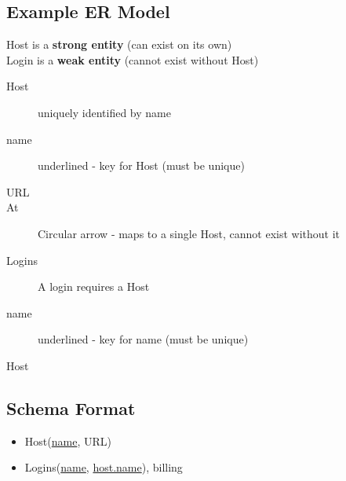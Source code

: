 \documentclass{article}
\begin{document}
\subsection{Example ER Model}

\begin{figure}[h!]
\end{figure}

Host is a \textbf{strong entity} (can exist on its own)\\
Login is a \textbf{weak entity} (cannot exist without Host)\\
\begin{description}
  \item[Host] uniquely identified by name
  \item[name] underlined - key for Host (must be unique)
  \item[URL]
  \item[At] Circular arrow - maps to a single Host, cannot exist without it
  \item[Logins] A login requires a Host
  \item[name] underlined - key for name (must be unique)
  \item[Host]
\end{description}

\subsection{Schema Format}
\begin{itemize}
  \item{Host(\underline{name}, URL)}
  \item{Logins(\underline{name}, \underline{host.name}), billing}
\end{itemize}
\end{document}

